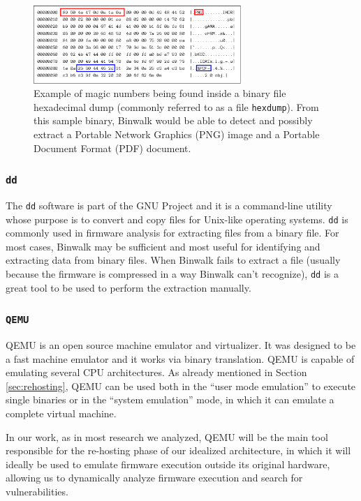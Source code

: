 \begin{figure}[H]
    \centering
    \includegraphics[width=0.7\textwidth]{figs/binwalk.eps}
    \caption{Example of magic numbers being found inside a binary file hexadecimal dump (commonly referred to as a file {\tt hexdump}). From this sample binary, Binwalk would be able to detect and possibly extract a Portable Network Graphics (PNG) image and a Portable Document Format (PDF) document.}
    \label{fig:binwalk}
\end{figure}


\subsubsection{ {\tt dd} }

The {\tt dd} software is part of the GNU Project and it is a command-line utility whose purpose is to convert and copy files for Unix-like operating systems. {\tt dd} is commonly used in firmware analysis for extracting files from a binary file. For most cases, Binwalk may be sufficient and most useful for identifying and extracting data from binary files. When Binwalk fails to extract a file (usually because the firmware is compressed in a way Binwalk can't recognize), {\tt dd} is a great tool to be used to perform the extraction manually.

\subsubsection{ {\tt QEMU} }
\label{sec:qemu}

QEMU \cite{qemu} is an open source machine emulator and virtualizer. It was designed to be a fast machine emulator and it works via binary translation. QEMU is capable of emulating several CPU architectures. As already mentioned in Section \ref{sec:rehosting}, QEMU can be used both in the ``user mode emulation'' to execute single binaries or in the ``system emulation'' mode, in which it can emulate a complete virtual machine.

In our work, as in most research we analyzed, QEMU will be the main tool responsible for the re-hosting phase of our idealized architecture, in which it will ideally be used to emulate firmware execution outside its original hardware, allowing us to dynamically analyze firmware execution and search for vulnerabilities.

